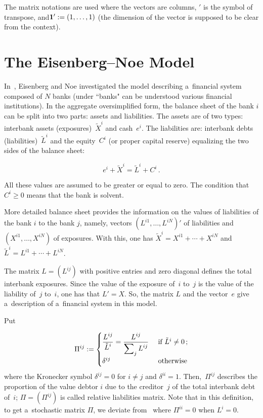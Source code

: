 \begin{multicols}{2}
The matrix notations are used where the vectors are columns, $'$ is the symbol of 
transpose, and\linebreak  ${\bf 1}':=(1,\dots,1)$ (the dimension of the vector is supposed 
to be clear from the context).

\vspace*{-9pt}

\section{The Eisenberg--Noe Model}

\noindent
In~\cite{Eisenberg-Noe}, Eisenberg and Noe investigated the model 
describing a~financial system composed of $N$ banks (under ``banks"  can be 
understood  various financial institutions). In the aggregate oversimplified  
form, the balance sheet of the bank $i$ can be split into two parts: assets and 
liabilities. The assets are of two types:  interbank assets (exposures)~$\tilde X^i$ 
and cash~$e^i$.  The liabilities are: interbank debts (liabilities)~$\tilde L^i$ 
and the equity~$C ^i$ (or proper capital reserve) equalizing the two sides 
of the balance sheet:
\vspace*{2pt}

\noindent
$$
e^i+\tilde X^i= \tilde L^i + C^i\,.
$$

\vspace*{-2pt}

\noindent
All these values are assumed to be greater or equal to zero. The condition that 
$C^i\ge 0$ means that the bank is solvent.

More detailed balance sheet provides the information on the values  of 
liabilities of the bank  $i$ to the bank $j$, namely,  vectors 
$(L^{i1},\ldots,L^{iN})'$ of liabilities and  $(X^{i1},\ldots,X^{iN})$ of exposures.
 With this, one 
has  $\tilde X^i=X^{i1}+\cdots+X^{iN}$ and $\tilde L^i =L^{i1}+\cdots+L^{iN}$.

The matrix $L=(L^{ij})$ with positive entries and zero diagonal defines the
total interbank exposures. Since the value of the exposure of~$i$ to~$j$ is the 
value of the liability of~$j$ to~$i$, one has that $L'=X$.  So, 
the matrix $L$ and the vector~$e$ give a~description of a~financial system in 
this model.

Put

\vspace*{-3pt}

\noindent
$$
\Pi^{ij}:=
\begin{cases}
\displaystyle\frac{\displaystyle L^{ij}\mathstrut}{\displaystyle \tilde L^i\mathstrut}=\displaystyle \displaystyle\frac{\displaystyle L^{ij}\mathstrut}{\displaystyle \sum\nolimits_j L^{ij}\mathstrut} 
&\ \mbox{if } \tilde L^i\neq 0\,; \\
\delta^{ij} &\  \mbox{otherwise}
\end{cases}
$$
where the Kronecker symbol $\delta^{ij}=0$ for $i\neq j$ and $\delta^{ii}=1$.
Then,~$\Pi^{ij}$  describes the proportion of the value debtor $i$ due to the 
creditor~$j$ of the total interbank debt of~$i$; $\Pi=(\Pi^{ij})$  is called 
relative liabilities matrix. Note that in this definition, to get a~stochastic 
matrix $\Pi$, we deviate from~\cite{Eisenberg-Noe} where $\Pi^{ii}=0$ when 
$L^i= 0$.


\end{multicols}

